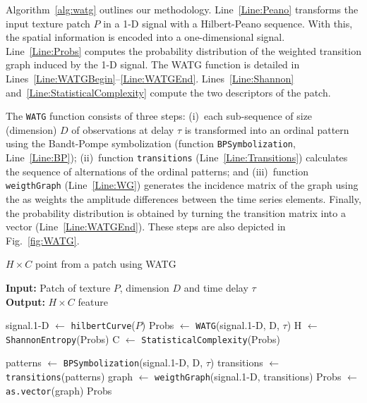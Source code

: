 \documentclass[journal]{IEEEtran}
\providecommand{\DIFaddtex}[1]{{\protect\color{blue}\uwave{#1}}} %
\providecommand{\DIFaddbegin}{} %
\providecommand{\DIFaddend}{} %
\providecommand{\DIFadd}[1]{\texorpdfstring{\DIFaddtex{#1}}{#1}} %
\newcommand{\DIFaddincludegraphics}[2][]{{\color{blue}\fbox{\DIFOincludegraphics[#1]{#2}}}} %
\DeclareRobustCommand{\DIFaddbegin}{\DIFOaddbegin \let\includegraphics\DIFaddincludegraphics} %
\DeclareRobustCommand{\DIFaddend}{\DIFOaddend \let\includegraphics\DIFOincludegraphics} %
\begin{document}
	Algorithm~\ref{alg:watg} outlines our methodology.
	Line~\ref{Line:Peano} transforms the input texture patch $P$ in a \mbox{1-D} signal with a Hilbert-Peano sequence.
	With this, the spatial information is encoded into a one-dimensional signal.
	Line~\ref{Line:Probs} computes 
	the probability distribution of the weighted transition graph induced by the \mbox{1-D} signal.
	The WATG function is detailed in Lines~\ref{Line:WATGBegin}--\ref{Line:WATGEnd}.
	Lines~\ref{Line:Shannon} and~\ref{Line:StatisticalComplexity} compute the two descriptors of the patch.
	
	The \texttt{WATG} function consists of three steps: 
	(i)~each sub-sequence of size (dimension) $D$ of observations at delay $\tau$ is transformed into an ordinal pattern using the Bandt-Pompe symbolization (function \texttt{BPSymbolization}, Line~\ref{Line:BP}); 
	(ii)~function \texttt{transitions} (Line~\ref{Line:Transitions}) calculates the sequence of alternations of the ordinal patterns; and 
	(iii)~function \texttt{weigthGraph} (Line~\ref{Line:WG}) generates the incidence matrix of the graph using the as weights the amplitude differences between the time series elements.
	Finally, the probability distribution is obtained by turning the transition matrix into a vector (Line~\ref{Line:WATGEnd}).
	These steps are also depicted in Fig.~\ref{fig:WATG}.
	
	\begin{algorithm}
		\caption{$H \times C$ point from a patch using WATG}
		\label{alg:watg}                                
		\textbf{Input:} Patch of texture $P$, dimension $D$ and time delay \textbf{$\tau$}\\
		\textbf{Output:} $H \times C$ feature
		\begin{algorithmic}[1]
			\State signal.\mbox{1-D} $\gets$ \texttt{hilbertCurve}($P$) \label{Line:Peano}
			\State Probs $\gets$ \texttt{WATG}(signal.\mbox{1-D}, D, $\tau$) \label{Line:Probs}
			\State H $\gets$ \texttt{ShannonEntropy}(Probs) \label{Line:Shannon}
			\State C $\gets$ \texttt{StatisticalComplexity}(Probs) \label{Line:StatisticalComplexity}
			\DIFaddbegin \State \Return \DIFadd{$\text{H}\times\text{C}$
			}\DIFaddend 
			
			\vspace{0.15cm}
			
			\State patterns $\gets$ \label{Line:WATGBegin} \texttt{BPSymbolization}(signal.\mbox{1-D}, D, $\tau$) \label{Line:BP}
			\State transitions $\gets$ \texttt{transitions}(patterns) \label{Line:Transitions}
			\State graph $\gets$ \texttt{weigthGraph}(signal.\mbox{1-D}, transitions) \label{Line:WG}
			\State Probs $\gets$ \texttt{as.vector}(graph) \label{Line:WATGEnd}
			\State \Return Probs
			\EndFunction
		\end{algorithmic}
	\end{algorithm}
	
\end{document}
